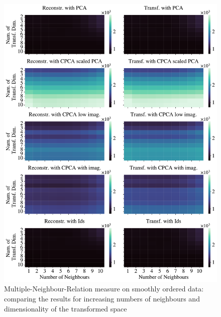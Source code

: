 \documentclass[pdftex,12pt,a4paper]{report}
\begin{document}
\begin{figure}
    \includegraphics[width = \textwidth]{images/multiple_runs/cpca/one_line/num_neigh_vs_dyn_low/multiple_scalar_product_10runs_5lines_100points_10neighbours.pdf}
    \caption{Multiple-Neighbour-Relation measure on smoothly ordered data: comparing the results for increasing numbers of neighbours and dimensionality of the transformed space}\label{fig:cpca-num_neigh_vs_dyn_low-oneline-mscal}
\end{figure}
\end{document}
